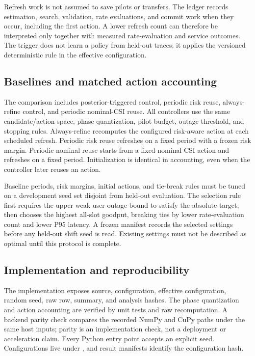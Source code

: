 \documentclass[10pt,twocolumn]{article}
\begin{document}
Refresh work is not assumed to save pilots or transfers. The ledger
records estimation, search, validation, rate evaluations, and commit
work when they occur, including the first action. A lower refresh count
can therefore be interpreted only together with measured rate-evaluation
and service outcomes. The trigger does not learn a policy from held-out
traces; it applies the versioned deterministic rule in the effective
configuration.

\subsection{Baselines and matched action
accounting}\label{baselines-and-matched-action-accounting}

The comparison includes posterior-triggered control, periodic risk
reuse, always-refine control, and periodic nominal-CSI reuse. All
controllers use the same candidate/action space, phase quantization,
pilot budget, outage threshold, and stopping rules. Always-refine
recomputes the configured risk-aware action at each scheduled refresh.
Periodic risk reuse refreshes on a fixed period with a frozen risk
margin. Periodic nominal reuse starts from a fixed nominal-CSI action
and refreshes on a fixed period. Initialization is identical in
accounting, even when the controller later reuses an action.

Baseline periods, risk margins, initial actions, and tie-break rules
must be tuned on a development seed set disjoint from held-out
evaluation. The selection rule first requires the upper weak-user outage
bound to satisfy the absolute target, then chooses the highest all-slot
goodput, breaking ties by lower rate-evaluation count and lower P95
latency. A frozen manifest records the selected settings before any
held-out shift seed is read. Existing settings must not be described as
optimal until this protocol is complete.

\subsection{Implementation and
reproducibility}\label{implementation-and-reproducibility}

The implementation exposes source, configuration, effective
configuration, random seed, raw row, summary, and analysis hashes. The
phase quantization and action accounting are verified by unit tests and
raw recomputation. A backend parity check compares the recorded NumPy
and CuPy paths under the same host inputs; parity is an implementation
check, not a deployment or acceleration claim. Every Python entry point
accepts an explicit seed. Configurations live under ,
and result manifests identify the configuration hash.
\end{document}
